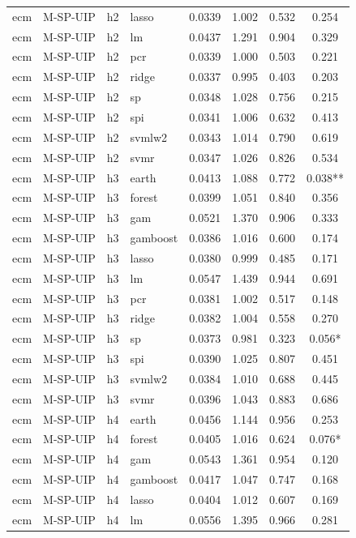 \begin{ThreePartTable}
\begin{longtable}[t]{llclcccc}
ecm & M-SP-UIP & h2 & lasso & 0.0339 & 1.002 & 0.532 & 0.254\\
ecm & M-SP-UIP & h2 & lm & 0.0437 & 1.291 & 0.904 & 0.329\\
ecm & M-SP-UIP & h2 & pcr & 0.0339 & 1.000 & 0.503 & 0.221\\
ecm & M-SP-UIP & h2 & ridge & 0.0337 & 0.995 & 0.403 & 0.203\\
ecm & M-SP-UIP & h2 & sp & 0.0348 & 1.028 & 0.756 & 0.215\\
ecm & M-SP-UIP & h2 & spi & 0.0341 & 1.006 & 0.632 & 0.413\\
ecm & M-SP-UIP & h2 & svmlw2 & 0.0343 & 1.014 & 0.790 & 0.619\\
ecm & M-SP-UIP & h2 & svmr & 0.0347 & 1.026 & 0.826 & 0.534\\
\addlinespace
ecm & M-SP-UIP & h3 & earth & 0.0413 & 1.088 & 0.772 & 0.038**\\
ecm & M-SP-UIP & h3 & forest & 0.0399 & 1.051 & 0.840 & 0.356\\
ecm & M-SP-UIP & h3 & gam & 0.0521 & 1.370 & 0.906 & 0.333\\
ecm & M-SP-UIP & h3 & gamboost & 0.0386 & 1.016 & 0.600 & 0.174\\
ecm & M-SP-UIP & h3 & lasso & 0.0380 & 0.999 & 0.485 & 0.171\\
ecm & M-SP-UIP & h3 & lm & 0.0547 & 1.439 & 0.944 & 0.691\\
ecm & M-SP-UIP & h3 & pcr & 0.0381 & 1.002 & 0.517 & 0.148\\
ecm & M-SP-UIP & h3 & ridge & 0.0382 & 1.004 & 0.558 & 0.270\\
ecm & M-SP-UIP & h3 & sp & 0.0373 & 0.981 & 0.323 & 0.056*\\
ecm & M-SP-UIP & h3 & spi & 0.0390 & 1.025 & 0.807 & 0.451\\
ecm & M-SP-UIP & h3 & svmlw2 & 0.0384 & 1.010 & 0.688 & 0.445\\
ecm & M-SP-UIP & h3 & svmr & 0.0396 & 1.043 & 0.883 & 0.686\\
\addlinespace
ecm & M-SP-UIP & h4 & earth & 0.0456 & 1.144 & 0.956 & 0.253\\
ecm & M-SP-UIP & h4 & forest & 0.0405 & 1.016 & 0.624 & 0.076*\\
ecm & M-SP-UIP & h4 & gam & 0.0543 & 1.361 & 0.954 & 0.120\\
ecm & M-SP-UIP & h4 & gamboost & 0.0417 & 1.047 & 0.747 & 0.168\\
ecm & M-SP-UIP & h4 & lasso & 0.0404 & 1.012 & 0.607 & 0.169\\
ecm & M-SP-UIP & h4 & lm & 0.0556 & 1.395 & 0.966 & 0.281\\

\end{longtable}
\end{ThreePartTable}
